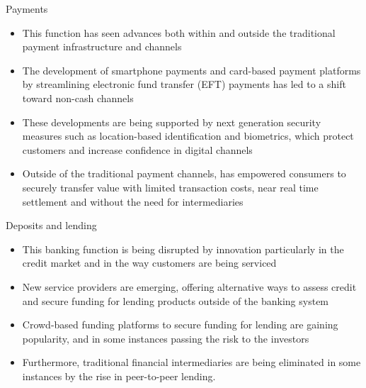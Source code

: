\documentclass[9pt]{beamer}
\begin{document}
\begin{frame}{Payments}
	\begin{itemize}
		\item This function has seen advances both within and outside the traditional payment infrastructure and channels
		\item The development of smartphone payments and card-based payment platforms by streamlining electronic fund transfer (EFT) payments has led to a shift toward non-cash channels
		\item These developments are being supported by next generation security measures such as location-based identification and biometrics, which protect customers and increase confidence in digital channels
		\item Outside of the traditional payment channels, has empowered consumers to securely transfer value with limited transaction costs, near real time settlement and without the need for intermediaries
	\end{itemize}
\end{frame}


\begin{frame}{Deposits and lending}
	\begin{itemize}
		\item This banking function is being disrupted by innovation particularly in the credit market and in the way customers are being serviced
		\item New service providers are emerging, offering alternative ways to assess credit and secure funding for lending products outside of the banking system
		\item Crowd-based funding platforms to secure funding for lending are gaining popularity, and in some instances passing the risk to the investors
		\item Furthermore, traditional financial intermediaries are being eliminated in some instances by the rise in peer-to-peer lending.
	\end{itemize}
\end{frame}

\end{document}
